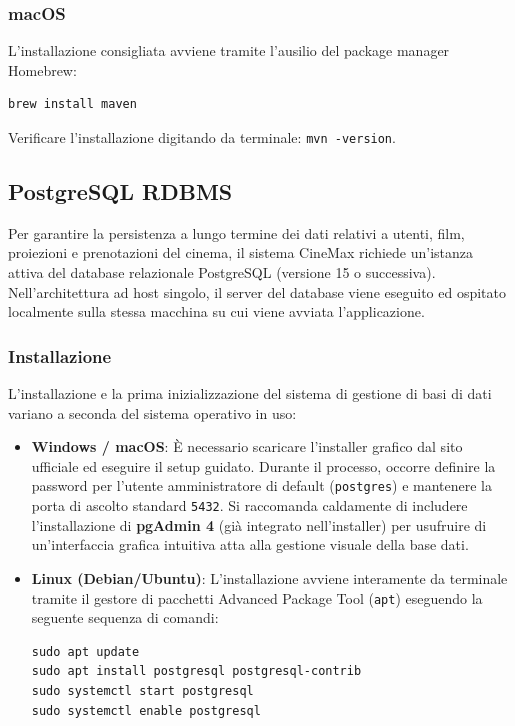 \documentclass{article}
\begin{document}
\subsubsection{macOS}
L'installazione consigliata avviene tramite l'ausilio del package manager Homebrew:
\begin{verbatim}
brew install maven
\end{verbatim}
Verificare l'installazione digitando da terminale: \texttt{mvn -version}.

\subsection{PostgreSQL RDBMS}
Per garantire la persistenza a lungo termine dei dati relativi a utenti, film, proiezioni e prenotazioni del cinema, il sistema CineMax richiede un'istanza attiva del database relazionale PostgreSQL (versione 15 o successiva). Nell'architettura ad host singolo, il server del database viene eseguito ed ospitato localmente sulla stessa macchina su cui viene avviata l'applicazione.

\subsubsection{Installazione}
L'installazione e la prima inizializzazione del sistema di gestione di basi di dati variano a seconda del sistema operativo in uso:
\begin{itemize}
    \item \textbf{Windows / macOS}: È necessario scaricare l'installer grafico dal sito ufficiale ed eseguire il setup guidato. Durante il processo, occorre definire la password per l'utente amministratore di default (\texttt{postgres}) e mantenere la porta di ascolto standard \texttt{5432}. Si raccomanda caldamente di includere l'installazione di \textbf{pgAdmin 4} (già integrato nell'installer) per usufruire di un'interfaccia grafica intuitiva atta alla gestione visuale della base dati.
    \item \textbf{Linux (Debian/Ubuntu)}: L'installazione avviene interamente da terminale tramite il gestore di pacchetti Advanced Package Tool (\texttt{apt}) eseguendo la seguente sequenza di comandi:
\begin{verbatim}
sudo apt update
sudo apt install postgresql postgresql-contrib
sudo systemctl start postgresql
sudo systemctl enable postgresql
\end{verbatim}
\end{itemize}
\end{document}

